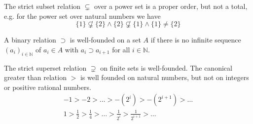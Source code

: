 \begin{example}The strict subset relation $\subsetneq$ over a power set is a proper order, but not a total, 
	e.g. for the power set over natural numbers we have 
	\[
	\{ 1 \} \not\subsetneq \{ 2 \}
	\land \{ 2 \} \not\subsetneq \{ 1 \}
	\land 	\{ 1 \} \neq \{ 2 \}
	\tag*{non-totality}
	\]
\end{example}



\begin{definition}
	A binary relation $\supset$ is {\myem well-founded} on a set $A$ if there is no infinite sequence 
	$(a_i)_{i\in\mathbb{N}}$ of $a_i\in A$
	with $a_i\supset a_{i+1}$ for all $i\in\mathbb{N}$.
\end{definition}

\begin{example}
	The strict superset relation $\supsetneq$ on finite sets is well-founded.
	The canonical greater than relation $>$ is well founded on natural numbers,
	but not on integers or positive rational numbers.
	\begin{gather*}
	-1 > -2 > \ldots > -(2^i) > -(2^{i+1}) > \ldots\\
	1 > \frac{1}{2} > \frac{1}{4} > \ldots > \frac{1}{2^i} > \frac{1}{2^{i+1}} > \ldots
	\end{gather*}
\end{example}


